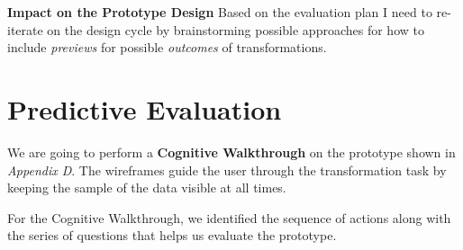 \documentclass[12pt,letterpaper]{article}
\begin{document}
\textbf{Impact on the Prototype Design}
Based on the evaluation plan I need to re-iterate on the design cycle by brainstorming possible approaches for how to include \textit{previews} for possible \textit{outcomes} of transformations. 

\section*{Predictive Evaluation}

We are going to perform a \textbf{Cognitive Walkthrough} on the prototype shown in \textit{Appendix D}. The wireframes guide the user through the transformation task by keeping the sample of the data visible at all times. 

For the Cognitive Walkthrough, we identified the sequence of actions along with the series of questions that helps us evaluate the prototype.
\end{document}
